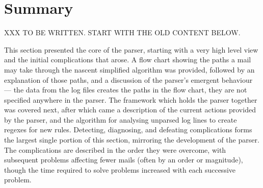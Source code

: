 \section{Summary}

XXX TO BE WRITTEN\@.  START WITH THE OLD CONTENT BELOW\@.

This section presented the core of the parser, starting with a very high
level view and the initial complications that arose.  A flow chart showing
the paths a mail may take through the nascent simplified algorithm was
provided, followed by an explanation of those paths, and a discussion of
the parser's emergent behaviour --- the data from the log files creates the
paths in the flow chart, they are not specified anywhere in the parser.
The framework which holds the parser together was covered next, after which
came a description of the current actions provided by the parser, and the
algorithm for analysing unparsed log lines to create regexes for new
rules.  Detecting, diagnosing, and defeating complications forms the largest
single portion of this section, mirroring the development of the parser.
The complications are described in the order they were overcome, with
subsequent problems affecting fewer mails (often by an order or magnitude),
though the time required to solve problems increased with each successive
problem.



